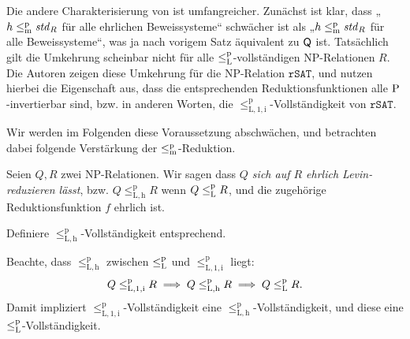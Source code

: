 Die andere Charakterisierung von \citeauthor{fenner_inverting_2003} ist umfangreicher.
Zunächst ist klar, dass „$h\leqmp\mathit{std}_R$ für alle ehrlichen Beweissysteme“ schwächer ist als „$h\leqmp\mathit{std}_R$ für alle Beweissysteme“, was ja nach vorigem Satz äquivalent zu $\hQ$ ist.
Tatsächlich gilt die Umkehrung scheinbar nicht für alle $\leqlp$-vollständigen NP-Relationen $R$. 
Die Autoren zeigen diese Umkehrung für die NP-Relation $\mathtt{rSAT}$, und nutzen hierbei die Eigenschaft aus, dass die entsprechenden Reduktionsfunktionen alle $\P$-invertierbar sind, bzw. in anderen Worten, die $\leq_\mathrm{L,1,i}^\mathrm p$-Vollständigkeit von $\mathtt{rSAT}$.

Wir werden im Folgenden diese Voraussetzung abschwächen, und betrachten dabei folgende Verstärkung der $\leqmp$-Reduktion.
\begin{definition}
    Seien $Q, R$ zwei NP-Relationen. Wir sagen dass \emph{$Q$ sich auf $R$ ehrlich Levin-reduzieren lässt}, bzw. $Q\leq_\mathrm{L,h}^\mathrm p R$ wenn $Q\leqlp R$, und die zugehörige Reduktionsfunktion $f$ ehrlich ist.

    Definiere $\leq_\mathrm{L,h}^\mathrm p$-Vollständigkeit entsprechend.
\end{definition}
Beachte, dass $\leq_\mathrm{L,h}^\mathrm p$ zwischen $\leqlp$ und $\leq_\mathrm{L,1,i}^\mathrm{p}$ liegt:
\[ Q\leq_\mathrm{L,1,i}^\mathrm{p} R \implies Q\leq_\mathrm{L,h}^\mathrm p R \implies Q\leqlp R. \]
Damit impliziert $\leq_\mathrm{L,1,i}^\mathrm{p}$-Vollständigkeit eine  $\leq_\mathrm{L,h}^\mathrm p$-Vollständigkeit, und diese eine $\leqlp$-Vollständigkeit.

